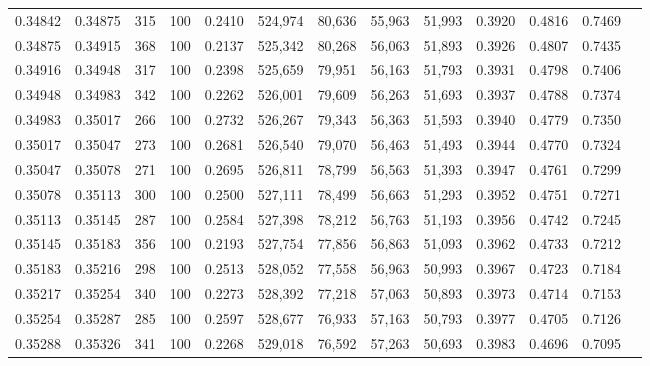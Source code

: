 \begin{tabular}{rrrrrrrrrrrrr}
0.34842 & 0.34875 &   315 & 100 &                                     0.2410 & 524,974 &  80,636 &  55,963 &  51,993 & 0.3920 & 0.4816 & 0.7469 \\
0.34875 & 0.34915 &   368 & 100 &                                     0.2137 & 525,342 &  80,268 &  56,063 &  51,893 & 0.3926 & 0.4807 & 0.7435 \\
0.34916 & 0.34948 &   317 & 100 &                                     0.2398 & 525,659 &  79,951 &  56,163 &  51,793 & 0.3931 & 0.4798 & 0.7406 \\
0.34948 & 0.34983 &   342 & 100 &                                     0.2262 & 526,001 &  79,609 &  56,263 &  51,693 & 0.3937 & 0.4788 & 0.7374 \\
0.34983 & 0.35017 &   266 & 100 &                                     0.2732 & 526,267 &  79,343 &  56,363 &  51,593 & 0.3940 & 0.4779 & 0.7350 \\
0.35017 & 0.35047 &   273 & 100 &                                     0.2681 & 526,540 &  79,070 &  56,463 &  51,493 & 0.3944 & 0.4770 & 0.7324 \\
0.35047 & 0.35078 &   271 & 100 &                                     0.2695 & 526,811 &  78,799 &  56,563 &  51,393 & 0.3947 & 0.4761 & 0.7299 \\
0.35078 & 0.35113 &   300 & 100 &                                     0.2500 & 527,111 &  78,499 &  56,663 &  51,293 & 0.3952 & 0.4751 & 0.7271 \\
0.35113 & 0.35145 &   287 & 100 &                                     0.2584 & 527,398 &  78,212 &  56,763 &  51,193 & 0.3956 & 0.4742 & 0.7245 \\
0.35145 & 0.35183 &   356 & 100 &                                     0.2193 & 527,754 &  77,856 &  56,863 &  51,093 & 0.3962 & 0.4733 & 0.7212 \\
0.35183 & 0.35216 &   298 & 100 &                                     0.2513 & 528,052 &  77,558 &  56,963 &  50,993 & 0.3967 & 0.4723 & 0.7184 \\
0.35217 & 0.35254 &   340 & 100 &                                     0.2273 & 528,392 &  77,218 &  57,063 &  50,893 & 0.3973 & 0.4714 & 0.7153 \\
0.35254 & 0.35287 &   285 & 100 &                                     0.2597 & 528,677 &  76,933 &  57,163 &  50,793 & 0.3977 & 0.4705 & 0.7126 \\
0.35288 & 0.35326 &   341 & 100 &                                     0.2268 & 529,018 &  76,592 &  57,263 &  50,693 & 0.3983 & 0.4696 & 0.7095 \\

\end{tabular}
